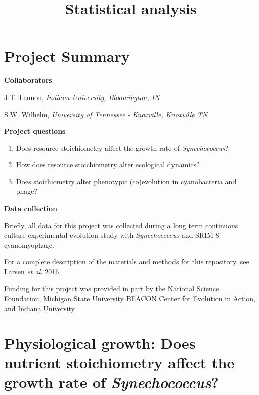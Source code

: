 \documentclass[]{article}
\title{Statistical analysis}
\author{}
\date{}
\providecommand{\tightlist}{%
  \setlength{\itemsep}{0pt}\setlength{\parskip}{0pt}}
\begin{document}
\maketitle

\section{Project Summary}\label{project-summary}

\textbf{Collaborators}

J.T. Lennon, \emph{Indiana University, Bloomington, IN}

S.W. Wilhelm, \emph{University of Tennessee - Knoxville, Knoxville TN}

\textbf{Project questions}

\begin{enumerate}
\def\labelenumi{\arabic{enumi}.}
\tightlist
\item
  Does resource stoichiometry affect the growth rate of
  \emph{Synechococcus}?
\item
  How does resource stoichiometry alter ecological dynamics?
\item
  Does stoichiometry alter phenotypic (co)evolution in cyanobacteria and
  phage?
\end{enumerate}

\textbf{Data collection}

Briefly, all data for this project was collected during a long term
continuous culture experimental evolution study with
\emph{Synechococcus} and SRIM-8 cyanomyophage.

For a complete description of the materials and methods for this
repository, see Larsen \emph{et al.} 2016.

Funding for this project was provided in part by the National Science
Foundation, Michigan State University BEACON Center for Evolution in
Action, and Indiana University.

\newpage

\tableofcontents
\newpage

\section{\texorpdfstring{Physiological growth: Does nutrient
stoichiometry affect the growth rate of
\emph{Synechococcus}?}{Physiological growth: Does nutrient stoichiometry affect the growth rate of Synechococcus?}}\label{physiological-growth-does-nutrient-stoichiometry-affect-the-growth-rate-of-synechococcus}
\end{document}
